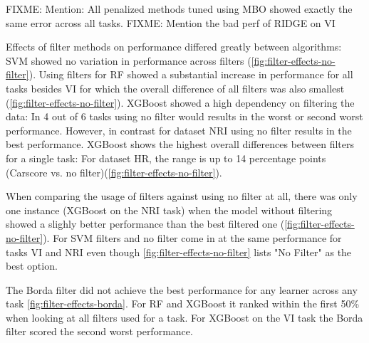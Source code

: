 \documentclass[letterpaper, peerreview]{IEEEtran}
\begin{document}
FIXME: Mention: All penalized methods tuned using MBO showed exactly the same error across all tasks.
FIXME: Mention the bad perf of RIDGE on VI

Effects of filter methods on performance differed greatly between algorithms:
SVM showed no variation in performance across filters (\autoref{fig:filter-effects-no-filter}).
Using filters for RF showed a substantial increase in performance for all tasks besides VI for which the overall difference of all filters was also smallest (\autoref{fig:filter-effects-no-filter}).
XGBoost showed a high dependency on filtering the data: In 4 out of 6 tasks using no filter would results in the worst or second worst performance.
However, in contrast for dataset NRI using no filter results in the best performance.
XGBoost shows the highest overall differences between filters for a single task: For dataset HR, the range is up to 14 percentage points (Carscore vs. no filter)(\autoref{fig:filter-effects-no-filter}).

When comparing the usage of filters against using no filter at all, there was only one instance (XGBoost on the NRI task) when the model without filtering showed a slighly better performance than the best filtered one (\autoref{fig:filter-effects-no-filter}).
For SVM filters and no filter come in at the same performance for tasks VI and NRI even though \autoref{fig:filter-effects-no-filter} lists "No Filter" as the best option.

The Borda filter did not achieve the best performance for any learner across any task \autoref{fig:filter-effects-borda}.
For RF and XGBoost it ranked within the first 50\% when looking at all filters used for a task.
For XGBoost on the VI task the Borda filter scored the second worst performance.



%


\end{document}
